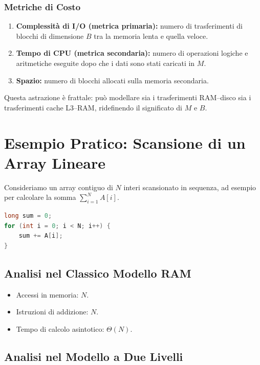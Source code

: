 \subsubsection{Metriche di Costo}

\begin{enumerate}
  \item \textbf{Complessità di I/O (metrica primaria):} numero di trasferimenti di blocchi di dimensione $B$ tra la memoria lenta e quella veloce.
  \item \textbf{Tempo di CPU (metrica secondaria):} numero di operazioni logiche e aritmetiche eseguite dopo che i dati sono stati caricati in $M$.
  \item \textbf{Spazio:} numero di blocchi allocati sulla memoria secondaria.
\end{enumerate}

Questa astrazione è frattale: può modellare sia i trasferimenti RAM--disco sia i trasferimenti cache L3--RAM, ridefinendo il significato di $M$ e $B$.

\section{Esempio Pratico: Scansione di un Array Lineare}
\label{sec:linear-scan}

Consideriamo un array contiguo di $N$ interi scansionato in sequenza, ad esempio per calcolare la somma $\sum_{i=1}^{N} A[i]$.

\begin{lstlisting}[style=code, language=C, caption={Scansione sequenziale di un array}, label={lst:linear-scan}]
long sum = 0;
for (int i = 0; i < N; i++) {
    sum += A[i];
}
\end{lstlisting}

\subsection{Analisi nel Classico Modello RAM}

\begin{itemize}
  \item Accessi in memoria: $N$.
  \item Istruzioni di addizione: $N$.
  \item Tempo di calcolo asintotico: $\Theta(N)$.
\end{itemize}

\subsection{Analisi nel Modello a Due Livelli}

